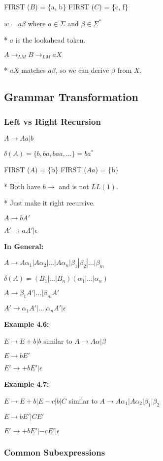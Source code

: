 \documentclass[twocolumn]{article}
\begin{document}
FIRST ($B$) = \{a, b\}
FIRST ($C$) = \{c, f\}

$w = a \beta$ where $a \in \Sigma$ and $\beta \in \Sigma ^*$

* $a$ is the lookahead token.

$A \to _{LM} B \to _{LM} aX$

* $aX$ matches $a \beta$, so we can derive $\beta$ from $X$.

\subsection{Grammar Transformation}

\subsubsection{Left vs Right Recursion}

$A \to Aa | b$

$\delta(A) = \{b, ba, baa, \dots\} = ba^*$

FIRST ($A$) = \{b\}
FIRST ($Aa$) = \{b\}

* Both have $b \to $ and is not $LL(1)$.

* Just make it right recursive.

$A \to bA'$

$A' \to aA' | \mathcal{\epsilon}$

\textbf{In General:}

$A \to A \alpha _1 | A \alpha _2 | \dots | A \alpha _n | \beta _1 | \beta _2 | \dots | \beta _m$

$\delta(A) = (B _1 | \dots | B _n) (\alpha _1 | \dots | \alpha _n) $

$A \to \beta _1 A' | \dots | \beta _m A'$

$A' \to \alpha _1 A' | \dots | \alpha _n A' | \mathcal{\epsilon}$

\textbf{Example 4.6:}

$E \to E + b | b$ similar to $A \to A \alpha | \beta$

$E \to bE'$

$E' \to + bE' | \mathcal{\epsilon}$

\newpage

\textbf{Example 4.7:}

$E \to E + b | E - c | b | C$ similar to $A \to A \alpha _1 | A \alpha _2 | \beta _1 | \beta _2$

$E \to bE' | CE'$

$E' \to + bE' | - cE' | \mathcal{\epsilon}$

\subsubsection{Common Subexpressions}
\end{document}
